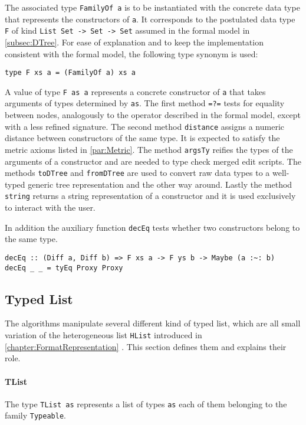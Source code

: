 \documentclass[../Thesis.tex]{subfiles}
\begin{document}
	The associated type \texttt{FamilyOf a} is to be instantiated with the 
	concrete data type that represents the constructors of \texttt{a}.
	It corresponds to the postulated data type \texttt{F} of kind
	\texttt{List Set -> Set -> Set} assumed in the formal model in 
	\ref{subsec:DTree}.
	For ease of explanation and to keep the implementation consistent 
	with the formal model, the following type synonym is used:
\begin{verbatim}
type F xs a = (FamilyOf a) xs a
\end{verbatim}
	A value of type \texttt{F as a} represents a concrete constructor
	of \texttt{a} that takes arguments of types determined 
	by \texttt{as}.
	The first method \texttt{=?=} tests for equality between nodes, analogously
	to the operator described in the formal model, except with a less 
	refined signature.
	The second method \texttt{distance} assigns a numeric distance
	between constructors of the same type. 
	It is expected to satisfy the metric axioms listed in \ref{par:Metric}.
	The method \texttt{argsTy} reifies the types of the arguments of a 
	constructor and are needed to type check merged edit scripts.
	The methods \texttt{toDTree} and \texttt{fromDTree} are used to convert
	raw data types to a well-typed generic tree representation
	and the other way around.
	Lastly the method \texttt{string} returns a string representation of a
	constructor and it is used exclusively to interact with the user.
		
	In addition the auxiliary function \texttt{decEq} tests whether
	two constructors belong to the same type.
	
\begin{verbatim}
decEq :: (Diff a, Diff b) => F xs a -> F ys b -> Maybe (a :~: b)
decEq _ _ = tyEq Proxy Proxy
\end{verbatim}

	\subsection{Typed List}		
	The algorithms manipulate several different kind of typed list,
	which are all small variation of the heterogeneous list \texttt{HList} 
	introduced in \ref{chapter:FormatRepresentation} . This section defines them and explains their role.
	
	\paragraph{TList}
	The type \texttt{TList as} represents a list of types \texttt{as} each 
	of them belonging to the family \texttt{Typeable}.
\end{document}
